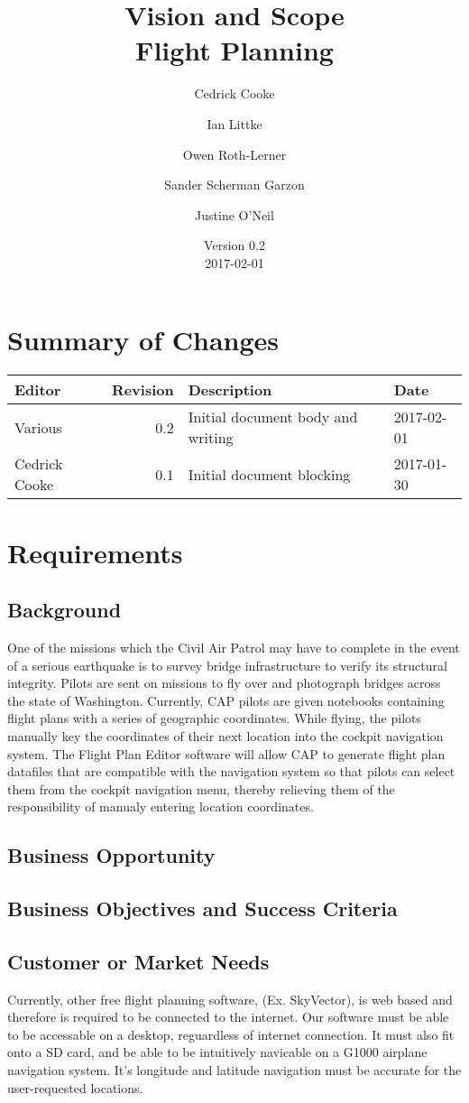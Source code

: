 \documentclass[12pt, letterpaper]{article}
\title{Vision and Scope \\
Flight Planning
}
\author{ Cedrick Cooke
    \and Ian Littke
    \and Owen Roth-Lerner
    \and Sander Scherman Garzon
    \and Justine O'Neil
}
\date{Version 0.2 \\ 2017-02-01}
\begin{document}
\maketitle

\tableofcontents

\section*{Summary of Changes}
\begin{tabularx}{\textwidth}{|l|r|X|l|}
\hline
Editor & Revision & Description & Date \\ \hline \hline
Various & 0.2 & Initial document body and writing & 2017-02-01 \\ \hline
Cedrick Cooke & 0.1 & Initial document blocking & 2017-01-30 \\ \hline
\end{tabularx}

\section{Requirements}
\subsection{Background}
One of the missions which the Civil Air Patrol may have to complete in the event of a serious earthquake is to survey bridge infrastructure to verify its structural integrity.  Pilots are sent on missions to fly over and photograph bridges across the state of Washington.  Currently, CAP pilots are given notebooks containing flight plans with a series of geographic coordinates.  While flying, the pilots manually key the coordinates of their next location into the cockpit navigation system.  The Flight Plan Editor software will allow CAP to generate flight plan datafiles that are compatible with the navigation system so that pilots can select them from the cockpit navigation menu, thereby relieving them of the responsibility of manualy entering location coordinates.

\subsection{Business Opportunity}


\subsection{Business Objectives and Success Criteria}
\subsection{Customer or Market Needs}
Currently, other free flight planning software, (Ex. SkyVector), is web based and therefore is required to be connected to the internet. Our software must be able to be accessable on a desktop, reguardless of internet connection. It must also fit onto a SD card, and be able to be intuitively navicable on a G1000 airplane navigation system. It's longitude and latitude navigation must be accurate for the user-requested locations. 
\end{document}
